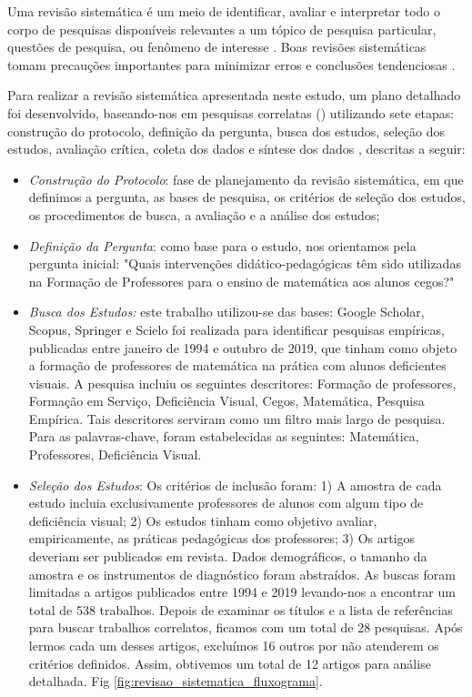 \documentclass[12pt]{article}
\begin{document}
Uma revisão sistemática é um meio de identificar, avaliar e interpretar todo o corpo de pesquisas disponíveis relevantes a um tópico de pesquisa particular, questões de pesquisa, ou fenômeno de interesse \cite{kitchenham2004procedures}. Boas revisões sistemáticas tomam precauções importantes para minimizar erros e conclusões tendenciosas \cite{littell2008systematic}.

\noindent
Para realizar a revisão sistemática apresentada neste estudo, um plano detalhado foi desenvolvido, baseando-nos em pesquisas correlatas (\cite{da2018processo}) utilizando sete etapas: construção do protocolo, definição da pergunta, busca dos estudos, seleção dos estudos, avaliação crítica, coleta dos dados e síntese dos dados \cite{galvao2009revisao}, descritas a seguir:
\begin{itemize}
    \item \textit{Construção do Protocolo}: fase de planejamento da revisão sistemática, em que definimos a pergunta, as bases de pesquisa, os critérios de seleção dos estudos, os procedimentos de busca, a avaliação e a análise dos estudos;
    \item \textit{Definição da Pergunta}: como base para o estudo, nos orientamos pela pergunta inicial: "Quais intervenções didático-pedagógicas têm sido utilizadas na Formação de Professores para o ensino de matemática aos alunos cegos?" 
    \item \textit{Busca dos Estudos:} este trabalho utilizou-se das bases: Google Scholar, Scopus, Springer e Scielo foi realizada para identificar pesquisas empíricas, publicadas entre janeiro de 1994 e outubro de 2019, que tinham como objeto a formação de professores de matemática na prática com alunos deficientes visuais. A pesquisa incluiu os seguintes descritores: Formação de professores, Formação em Serviço, Deficiência Visual, Cegos, Matemática, Pesquisa Empírica. Tais descritores serviram como um filtro mais largo de pesquisa. Para as palavras-chave, foram estabelecidas as seguintes: Matemática, Professores, Deficiência Visual. 
    \item \textit{Seleção dos Estudos}: Os critérios de inclusão foram: 1) A amostra de cada estudo incluia exclusivamente professores de alunos com algum tipo de deficiência visual; 2) Os estudos tinham como objetivo avaliar, empiricamente, as práticas pedagógicas dos professores; 3) Os artigos deveriam ser publicados em revista. Dados demográficos, o tamanho da amostra e os instrumentos de diagnóstico foram abstraídos. 
    As buscas foram limitadas a artigos publicados entre 1994 e 2019 levando-nos a encontrar um total de 538 trabalhos. Depois de examinar os títulos e a lista de referências para buscar trabalhos correlatos, ficamos com um total de 28 pesquisas. Após lermos cada um desses artigos, excluímos 16 outros por não atenderem os critérios definidos. Assim, obtivemos um total de 12 artigos para análise detalhada. Fig \ref{fig:revisao_sistematica_fluxograma}.

\end{itemize}
\end{document}
